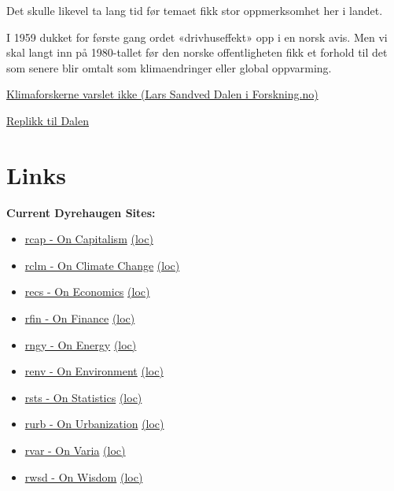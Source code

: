 \documentclass[
]{book}
\providecommand{\tightlist}{%
  \setlength{\itemsep}{0pt}\setlength{\parskip}{0pt}}
\begin{document}
Det skulle likevel ta lang tid før temaet fikk stor oppmerksomhet her i landet.

I 1959 dukket for første gang ordet «drivhuseffekt» opp i en norsk avis. Men vi skal langt inn på 1980-tallet før den norske offentligheten fikk et forhold til det som senere blir omtalt som klimaendringer eller global oppvarming.

\href{https://forskning.no/media/hvorfor-varslet-ikke-norske-forskere-om-klimaendringene-tidligere/1795682}{Klimaforskerne varslet ikke (Lars Sandved Dalen i Forskning.no)}

\href{https://forskersonen.no/klima-kronikk-meninger/hvor-skrasikre-kunne-forskerne-egentlig-vaere-om-klimaendringene-for-90-tallet/1802246}{Replikk til Dalen}

\hypertarget{links}{%
\chapter{Links}\label{links}}

\textbf{Current Dyrehaugen Sites:}

\begin{itemize}
\tightlist
\item
  \href{https://dyrehaugen.github.io/rcap}{rcap - On Capitalism} \href{http://localhost/rcap}{(loc)}
\item
  \href{https://dyrehaugen.github.io/rclm}{rclm - On Climate Change} \href{http://localhost/rclm}{(loc)}
\item
  \href{https://dyrehaugen.github.io/recs}{recs - On Economics} \href{http://localhost/recs}{(loc)}
\item
  \href{https://dyrehaugen.github.io/rngy}{rfin - On Finance} \href{http://localhost/rfin}{(loc)}
\item
  \href{https://dyrehaugen.github.io/rngy}{rngy - On Energy} \href{http://localhost/rngy}{(loc)}
\item
  \href{https://dyrehaugen.github.io/renv}{renv - On Environment} \href{http://localhost/renv}{(loc)}
\item
  \href{https://dyrehaugen.github.io/rsts}{rsts - On Statistics} \href{http://localhost/rsts}{(loc)}
\item
  \href{https://dyrehaugen.github.io/rurb}{rurb - On Urbanization} \href{http://localhost/rurb}{(loc)}
\item
  \href{https://dyrehaugen.github.io/rvar}{rvar - On Varia} \href{http://localhost/rvar}{(loc)}
\item
  \href{https://dyrehaugen.github.io/rwsd}{rwsd - On Wisdom} \href{http://localhost/rwsd}{(loc)}
\end{itemize}
\end{document}
